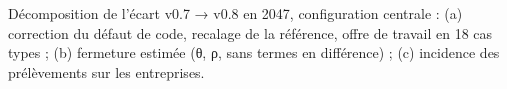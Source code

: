 \begin{table}[htbp]\centering\scriptsize
\caption{Décomposition de l'écart v0.7 → v0.8 en 2047, configuration centrale : (a) correction du défaut de code, recalage de la référence, offre de travail en 18 cas types ; (b) fermeture estimée (θ, ρ, sans termes en différence) ; (c) incidence des prélèvements sur les entreprises.}\label{tab:decomp}
\end{table}

